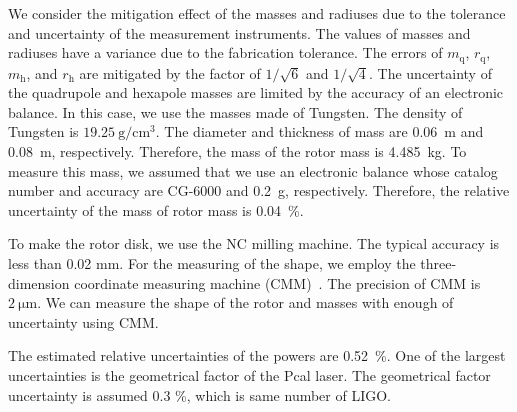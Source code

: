 \documentclass[%
 reprint,
superscriptaddress,
 amsmath,amssymb,
 aps,
]{revtex4-1}
\begin{document}
 We consider the mitigation effect of the masses and radiuses due to the tolerance and uncertainty of the measurement instruments. The values of masses and radiuses have a variance due to the fabrication tolerance. The errors of $m_{\mathrm{q}}$, $r_{\mathrm{q}}$, $m_{\mathrm{h}}$, and $r_{\mathrm{h}}$ are mitigated by the factor of $1/\sqrt{6}$ and $1/\sqrt{4}$. 
The uncertainty of the quadrupole and hexapole masses are limited by the accuracy of  an electronic balance. In this case, we use the masses made of Tungsten. The density of Tungsten is $19.25~\mathrm{g/cm^3}$. The diameter and thickness of mass are 0.06~m and 0.08~m, respectively. Therefore, the mass of the rotor mass is 4.485~kg. To measure this mass, we assumed that we use an electronic balance whose catalog number and accuracy are CG-6000 and 0.2~g, respectively. Therefore, the relative uncertainty of the mass of rotor mass is 0.04~\%.

 To make the rotor disk, we use the NC milling machine. The typical accuracy is less than 0.02 mm. For the measuring of the shape, we employ the three-dimension coordinate measuring machine (CMM)~\cite{Inoue:2016kyq}. The precision of CMM is $2~\mathrm{\mu m}$. We can measure the shape of the rotor and masses with enough of uncertainty using CMM. 

The estimated relative uncertainties of the powers are 0.52~\%. One of the largest uncertainties is the geometrical factor of the Pcal laser. The geometrical factor uncertainty is assumed 0.3 \%, which is same number of LIGO. 
\end{document}

